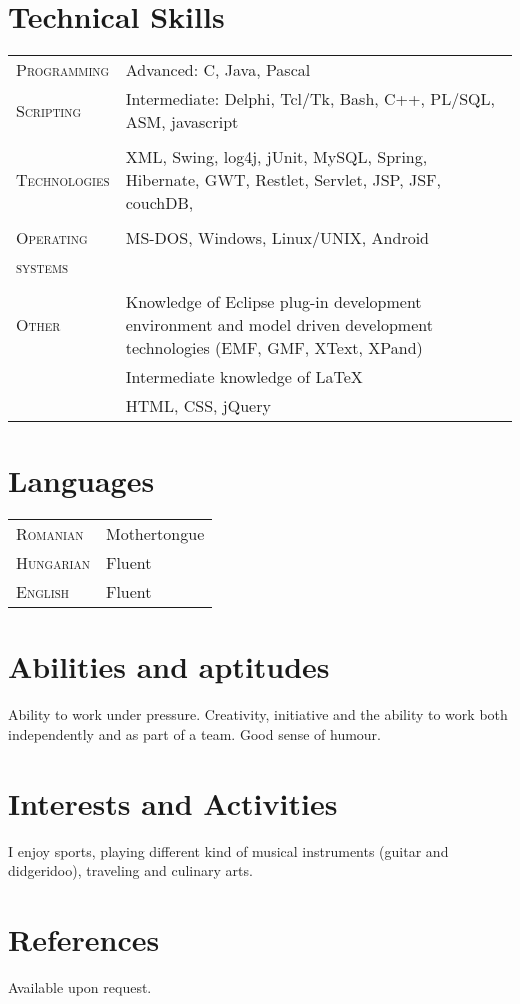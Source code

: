 \documentclass[a4paper,10pt]{article}
\begin{document}
\section{Technical Skills}
\begin{tabular}{p{2.5cm}p{11cm}}
\textsc{Programming} & Advanced: C, Java, Pascal\\
\textsc{Scripting} & Intermediate: Delphi, Tcl/Tk, Bash, C++, PL/SQL, ASM,
javascript\\ \multicolumn{2}{c}{} \\ 
\textsc{Technologies} & XML, Swing, log4j, jUnit, MySQL, Spring, Hibernate,
 GWT, Restlet, Servlet, JSP, JSF,  couchDB, \\ 
 \multicolumn{2}{c}{} \\
 \textsc{Operating} & MS-DOS, Windows, Linux/UNIX, Android\\
 \textsc{systems}&\\ 
 \multicolumn{2}{c}{} \\
 \textsc{Other} & Knowledge of Eclipse plug-in development environment and model
 driven development technologies (EMF, GMF, XText, XPand)\\
 & Intermediate knowledge of \LaTeX \\
 & HTML, CSS, jQuery\\
\end{tabular}

\section{Languages}
\begin{tabular}{p{2.5cm}p{11cm}}
\textsc{Romanian}& Mothertongue\\
\textsc{Hungarian}& Fluent\\
\textsc{English}& Fluent\\
\end{tabular}

\section{Abilities and aptitudes}
Ability to work under pressure.
Creativity, initiative and the ability to work both independently and as part of
a team. Good sense of humour.

\section{Interests and Activities}
I enjoy sports, playing different kind of musical instruments (guitar and
didgeridoo), traveling and culinary arts.

\section{References}
Available upon request.


\end{document}

